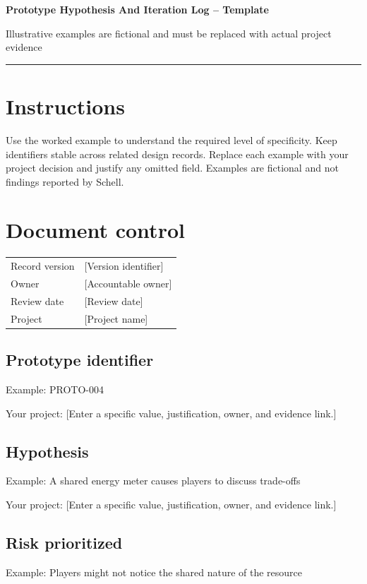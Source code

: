 \documentclass[11pt]{article}
\begin{document}
{\huge\bfseries\color{suiteblue} Prototype Hypothesis And Iteration Log -- Template}\par
\vspace{0.15in}
{\normalsize\color{suitegray} Illustrative examples are fictional and must be replaced with actual project evidence}\par
\vspace{0.15in}\hrule\vspace{0.15in}

\section{Instructions}
Use the worked example to understand the required level of specificity. Keep identifiers stable across related design records. Replace each example with your project decision and justify any omitted field. Examples are fictional and not findings reported by Schell.


\section{Document control}
\begin{tabularx}{\linewidth}{@{}lX@{}}\toprule Record version & [Version identifier]\\ Owner & [Accountable owner]\\ Review date & [Review date]\\ Project & [Project name]\\\bottomrule\end{tabularx}

\subsection{Prototype identifier}
Example: PROTO-004

Your project: [Enter a specific value, justification, owner, and evidence link.]


\subsection{Hypothesis}
Example: A shared energy meter causes players to discuss trade-offs

Your project: [Enter a specific value, justification, owner, and evidence link.]


\subsection{Risk prioritized}
Example: Players might not notice the shared nature of the resource
\end{document}
